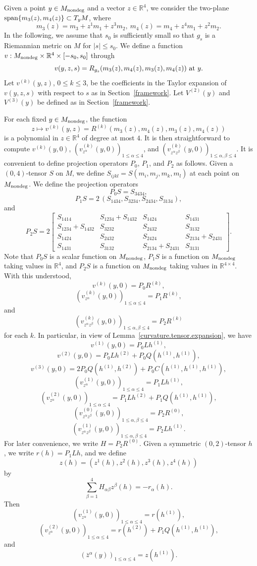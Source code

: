 \documentclass[11pt]{amsart}
\theoremstyle{definition}
\begin{document}
Given a point $y \in M_{\text{\rm nondeg}}$ and a vector $z \in \mathbb{R}^4$, we consider the two-plane $\text{\rm span}\{m_3(z),m_4(z)\} \subset T_y M$, where 
\[ m_3(z)=m_3+z^1 m_1+z^3 m_2,\ m_4(z)=m_4+z^4 m_1+z^2 m_2. \] 
In the following, we assume that $s_0$ is sufficiently small so that $g_s$ is a Riemannian metric on $M$ for $|s|\leq s_0$. We define a function $v: M_{\text{\rm nondeg}}\times\mathbb{R}^4\times [-s_0,s_0]$ through
\[v(y,z,s)= R_{g_s}(m_3(z),m_4(z),m_3(z),m_4(z))\ \text{\rm at}\ y.\]
Let $v^{(k)}(y,z)$, $0\leq k\leq 3$, be the coefficients in the Taylor expansion of $v(y,z,s)$ with respect to $s$ as in Section~\ref{framework}.
Let $V^{(2)}(y)$ and $V^{(3)}(y)$ be defined as in Section~\ref{framework}.

For each fixed $y \in M_{\text{\rm nondeg}}$, the function 
\[z \mapsto v^{(k)}(y,z)=R^{(k)}(m_3(z),m_4(z),m_3(z),m_4(z))\]
is a polynomial in $z\in\mathbb{R}^4$ of degree at most $4$. It is then straightforward to compute $v^{(k)}(y,0)$, $(v^{(k)}_{z^\alpha}(y,0))_{1\leq \alpha\leq 4}$, and $(v^{(k)}_{z^\alpha z^\beta}(y,0))_{1\leq \alpha,\beta\leq 4}$. 
It is convenient to define projection operators $P_0$, $P_1$, and $P_2$ as follows.
Given a $(0,4)$-tensor $S$ on $M$, we define $S_{ijkl}=S(m_i,m_j,m_k,m_l)$ at each point on $M_{\text{\rm nondeg}}$. We define the projection operators
$$P_0S=S_{3434},$$
$$ P_1S= 2 \, (S_{1434},S_{3234},S_{2434},S_{3134}), $$
and
\[P_2S = 2 \begin{bmatrix} S_{1414} & S_{1234}+S_{1432} & S_{1424} & S_{1431}\\
S_{1234}+S_{1432} & S_{3232} & S_{2432} & S_{3132}\\
S_{1424} & S_{2432} & S_{2424} & S_{2134}+S_{2431}\\
S_{1431} & S_{3132} & S_{2134}+S_{2431} & S_{3131} \end{bmatrix}.\] 
Note that $P_0 S$ is a scalar function on $M_{\text{\rm nondeg}}$, $P_1 S$ is a function on $M_{\text{\rm nondeg}}$ taking values in $\mathbb{R}^4$, and $P_2 S$ is a function on $M_{\text{\rm nondeg}}$ taking values in $\mathbb{R}^{4 \times 4}$. With this understood,
\[v^{(k)}(y,0)=P_0R^{(k)},\]
\[(v^{(k)}_{z^\alpha}(y,0))_{1\leq \alpha\leq 4}=P_1R^{(k)},\]
and
\[(v^{(k)}_{z^\alpha z^\beta}(y,0))_{1\leq \alpha,\beta\leq 4}=P_2R^{(k)}\]
for each $k$. In particular, in view of Lemma~\ref{curvature.tensor.expansion}, we have
\[v^{(1)}(y,0)=P_0Lh^{(1)},\] 
\[v^{(2)}(y,0)=P_0Lh^{(2)}+P_0Q(h^{(1)},h^{(1)}),\] 
\[v^{(3)}(y,0)=2P_0Q(h^{(1)},h^{(2)})+P_0C(h^{(1)},h^{(1)},h^{(1)}),\]
\[(v^{(1)}_{z^\alpha}(y,0))_{1\leq \alpha\leq 4}=P_1Lh^{(1)},\]
\[ (v^{(2)}_{z^\alpha}(y,0))_{1\leq \alpha\leq 4}=P_1Lh^{(2)}+P_1Q(h^{(1)},h^{(1)}), \]
\[ (v^{(0)}_{z^\alpha z^\beta}(y,0))_{1\leq \alpha,\beta\leq 4}=P_2R^{(0)}, \]
\[ (v^{(1)}_{z^\alpha z^\beta}(y,0))_{1\leq \alpha,\beta\leq 4}=P_2Lh^{(1)}. \] 
For later convenience, we write $H = P_2R^{(0)}$. Given a symmetric $(0,2)$-tensor $h$, we write $r(h) = P_1Lh$, and we define 
\[z(h)=(z^1(h),z^2(h),z^3(h),z^4(h)) \]
by
\[ \sum_{\beta=1}^4 H_{\alpha\beta}z^\beta(h)=-r_\alpha(h).\]
Then
\[(v^{(1)}_{z^\alpha}(y,0))_{1\leq \alpha\leq 4}=r(h^{(1)}),\] 
\[ (v^{(2)}_{z^\alpha}(y,0))_{1\leq \alpha\leq 4}=r(h^{(2)})+P_1Q(h^{(1)},h^{(1)}),\]
and 
\[(\bar{z}^{\alpha}(y))_{1\leq \alpha\leq 4}=z(h^{(1)}).\]
\end{document}
